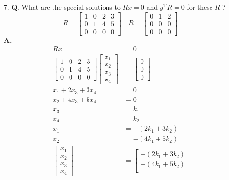 \documentclass[main.tex]{subfiles}
\begin{document}
\begin{enumerate}
    \item [7.] \textbf{Q.} What are the special solutions to $R x=0$ and $y^{\mathrm{T}} R=0$ for these $R$ ?
    $$
    R=\left[\begin{array}{llll}
    1 & 0 & 2 & 3 \\
    0 & 1 & 4 & 5 \\
    0 & 0 & 0 & 0
    \end{array}\right] \quad R=\left[\begin{array}{lll}
    0 & 1 & 2 \\
    0 & 0 & 0 \\
    0 & 0 & 0
    \end{array}\right]
    $$
    \textbf{A.}
    $$
    \begin{aligned}
    R x&=0\\
    \left[\begin{array}{llll}
    1 & 0 & 2 & 3 \\
    0 & 1 & 4 & 5 \\
    0 & 0 & 0 & 0
    \end{array}\right]\left[\begin{array}{l}
    x_{1} \\
    x_{2} \\
    x_{3} \\
    x_{4}
    \end{array}\right]&=\left[\begin{array}{l}
    0 \\
    0 \\
    0
    \end{array}\right]\\
    x_{1}+2 x_{3}+3 x_{4} &= 0 \\
    x_{2}+4 x_{3}+5 x_{4} &= 0 \\
    x_{3} &= k_{1} \\
    x_{4} &= k_{2} \\
    x_{1} &= -\left(2 k_{1}+3 k_{2}\right) \\
    x_{2} &= -\left(4 k_{1}+5 k_{2}\right) \\
    \left[\begin{array}{l}
    x_{1} \\
    x_{2} \\
    x_{3} \\
    x_{4}
    \end{array}\right]&=\left[\begin{array}{c}
    -\left(2 k_{1}+3 k_{2}\right) \\
    -\left(4 k_{1}+5 k_{2}\right) \\

\end{array}
\end{aligned}$$
\end{enumerate}
\end{document}
